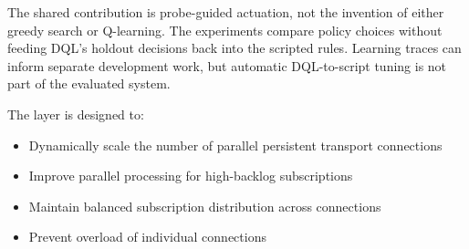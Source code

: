 \documentclass[manuscript,nonacm]{acmart}
\begin{document}
The shared contribution is probe-guided actuation, not the invention of either
greedy search or Q-learning. The experiments compare policy choices without
feeding DQL's holdout decisions back into the scripted rules. Learning traces
can inform separate development work, but automatic DQL-to-script tuning is
not part of the evaluated system.

The layer is designed to:
   
   \begin{itemize}
   	\item Dynamically scale the number of parallel persistent transport connections
   	\item Improve parallel processing for high-backlog subscriptions
   	\item Maintain balanced subscription distribution across connections
   	\item Prevent overload of individual connections
   \end{itemize}
\end{document}
